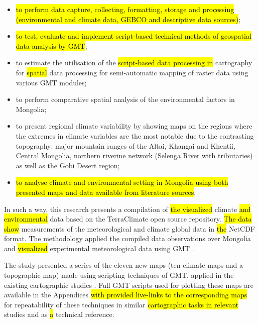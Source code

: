 \documentclass[geosciences,article,submit,pdftex,moreauthors]{Definitions/mdpi}
\begin{document}
\begin{itemize}
	\item \hl{to perform data capture, collecting, formatting, storage and processing (environmental and climate data, GEBCO and descriptive data sources)};
	\item \hl{to test, evaluate and implement script-based technical methods of geospatial data analysis by GMT};
	\item	to estimate the utilisation of the \hl{script-based data processing in} cartography for \hl{spatial} data processing for semi-automatic mapping of raster data using various GMT modules;
	\item	to perform comparative spatial analysis of the environmental factors in Mongolia;
	\item	to present regional climate variability by showing maps on the regions where the extremes in climate variables are the most notable due to the contrasting topography: major mountain ranges of the Altai, Khangai and Khentii, Central Mongolia, northern riverine network (Selenga River with tributaries) as well as the Gobi Desert region;
	\item \hl{to analyse climate and environmental setting in Mongolia using both presented maps and data available from literature sources}.
\end{itemize}

In such a way, this research presents a compilation of \hl{the visualized} climate \hl{and environmental} data based on the TerraClimate open source repository. \hl{The data show} measurements of the meteorological and climate global data in \hl{the} NetCDF format. The methodology applied the compiled data observations over Mongolia and \hl{visualized} experimental meteorological data using GMT \cite{Wesseletal2019}. 

The study presented a series of the eleven new maps (ten climate maps and a topographic map) made using scripting techniques of GMT, applied in the existing cartographic studies \cite{Lemenkova2019a,Kasalica,Lemenkova2021d,Spinellis,Lemenkova2021e,Virden}. Full GMT scripts used for plotting these maps are available in the Appendices \hl{with provided live-links to the corresponding maps} for repeatability of these techniques in similar \hl{cartographic tasks in relevant} studies and as \hl{a} technical reference.
\end{document}
